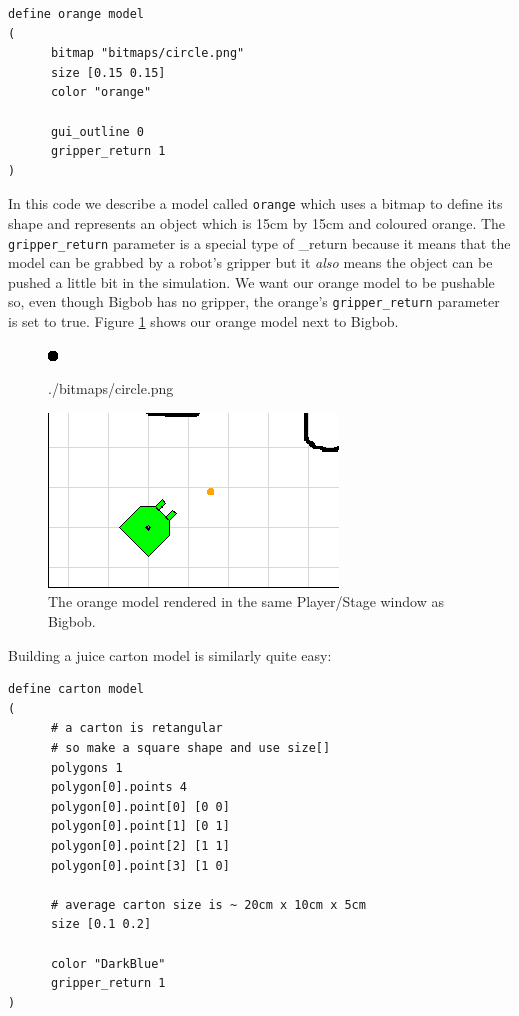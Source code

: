 \documentclass[a4paper]{report}
\newcommand{\plst}{Player/Stage\xspace}
\begin{document}
\begin{verbatim}
define orange model
(
      bitmap "bitmaps/circle.png"
      size [0.15 0.15]
      color "orange"
      
      gui_outline 0
      gripper_return 1
)
\end{verbatim}
In this code we describe a model called \verb|orange| which uses a bitmap to define its shape and represents an object which is 15cm by 15cm and coloured orange. The \verb|gripper_return| parameter is a special type of \_return because it means that the model can be grabbed by a robot's gripper but it \emph{also} means the object can be pushed a little bit in the simulation. We want our orange model to be pushable so, even though Bigbob has no gripper, the orange's \verb|gripper_return| parameter is set to true. Figure \ref{fig:orangeandbob} shows our orange model next to Bigbob.
\begin{figure}
	\centering
	\begin{minipage}[c]{0.2\linewidth}
		\centering
		\includegraphics{./pics/oranges_box/circle.png} 
		\caption{./bitmaps/circle.png}
		\label{fig:circle.png}	
	\end{minipage}%
	\hspace{0.1\linewidth}
	\begin{minipage}[c]{0.6\linewidth}
		\centering
		\includegraphics[width=\linewidth]{./pics/oranges_box/orange_and_bob.png} 
		\caption{The orange model rendered in the same \plst window as Bigbob.}
		\label{fig:orangeandbob}
	\end{minipage}	
\end{figure}

Building a juice carton model is similarly quite easy:
\begin{verbatim}
define carton model
(
      # a carton is retangular
      # so make a square shape and use size[]
      polygons 1
      polygon[0].points 4
      polygon[0].point[0] [0 0]
      polygon[0].point[1] [0 1]
      polygon[0].point[2] [1 1]
      polygon[0].point[3] [1 0]
	
      # average carton size is ~ 20cm x 10cm x 5cm
      size [0.1 0.2]
	
      color "DarkBlue"
      gripper_return 1
)
\end{verbatim}
\end{document}
